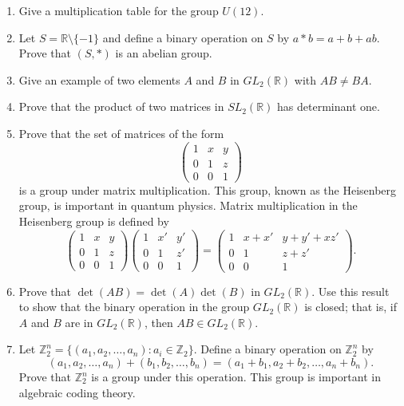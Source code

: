 {\begin{enumerate}
 
\item
Give a multiplication table for the group $U(12)$.
 
 
\item
Let $S = {\mathbb R} \setminus \{ -1 \}$ and define a binary operation on
$S$ by $a \ast b = a + b +ab$. Prove that $(S, \ast)$ is an abelian
group.
 
 
\item
Give an example of two elements $A$ and $B$ in $GL_2({\mathbb R})$ with
$AB \neq BA$.
 
 
\item
Prove that the product of two matrices in $SL_2({\mathbb R})$ has
determinant one.
 
 
\item
Prove that the set of matrices of the form
$$
\left(
\begin{array}{ccc}
1 & x & y \\
0 & 1 & z \\
0 & 0 & 1
\end{array}
\right)
$$
is a group under matrix multiplication.  This group, known as the
{\bfi Heisenberg group}, is important in
quantum physics.  Matrix multiplication in the Heisenberg group is
defined by  
$$
\left(
\begin{array}{ccc}
1 & x & y \\
0 & 1 & z \\
0 & 0 & 1
\end{array}
\right)
\left(
\begin{array}{ccc}
1 & x' & y' \\
0 & 1 & z' \\
0 & 0 & 1
\end{array}
\right)
=
\left(
\begin{array}{ccc}
1 & x+x' & y+y'+xz' \\
0 & 1 & z+z' \\
0 & 0 & 1
\end{array}
\right).
$$
 
 
\item %
Prove that $\det(AB) = \det(A) \det(B)$ in $GL_2({\mathbb R})$. Use this
result to show that the binary operation in the group $GL_2({\mathbb R})$
is closed; that is, if $A$ and $B$ are in $GL_2({\mathbb R})$, then $AB
\in GL_2({\mathbb R})$.
 
 
\item %
Let ${\mathbb Z}_2^n = \{ (a_1, a_2, \ldots, a_n) : a_i \in {\mathbb Z}_2
\}$. Define a binary operation on ${\mathbb Z}_2^n$ by
$$
(a_1, a_2, \ldots, a_n)
+
(b_1, b_2, \ldots, b_n)
=
(a_1+b_1, a_2+b_2, \ldots, a_n+b_n).
$$
Prove that ${\mathbb Z}_2^n$ is a group under this operation. This group
is important in algebraic coding theory. 
 

\end{enumerate}}
